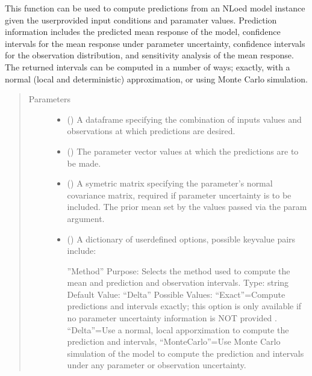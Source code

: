 \documentclass[letterpaper,10pt,english,openany,oneside]{sphinxmanual}
\begin{document}
\begin{fulllineitems}
\begin{fulllineitems}
This function can be used to compute predictions from an NLoed model instance given the
user\sphinxhyphen{}provided input conditions and paramater values. Prediction information includes the
predicted mean response of the model, confidence intervals for the mean response under
parameter uncertainty, confidence intervals for the observation distribution, and sensitivity
analysis of the mean response. The returned intervals can be computed in a number of ways;
exactly, with a normal (local and deterministic) approximation, or using Monte Carlo simulation.
\begin{quote}\begin{description}
\item[{Parameters}] \leavevmode\begin{itemize}
\item {} 
 () \textendash{} A dataframe specifying the combination of inputs values and
observations at which predictions are desired.

\item {} 
 (\sphinxstyleliteralemphasis{\sphinxupquote{, }}) \textendash{} The parameter vector values at which the predictions are to be made.

\item {} 
 (\sphinxstyleliteralemphasis{\sphinxupquote{, }}\sphinxstyleliteralemphasis{\sphinxupquote{, }}) \textendash{} A symetric matrix specifying the parameter’s
normal covariance matrix, required if parameter uncertainty is to be included. The
prior mean set by the values passed via the param argument.

\item {} 
 (\sphinxstyleliteralemphasis{\sphinxupquote{, }}) \textendash{} 
A dictionary of user\sphinxhyphen{}defined options, possible key\sphinxhyphen{}value
pairs include:

”Method” \textendash{}
Purpose: Selects the method used to compute the mean and prediction and observation
intervals.
Type: string
Default Value: “Delta”
Possible Values: “Exact”=Compute predictions and intervals exactly; this
option is only available if no parameter uncertainty information is NOT provided .
“Delta”=Use a normal, local apporximation to compute the prediction and
intervals, “MonteCarlo”=Use Monte Carlo simulation of the model to compute the
prediction and intervals under any parameter or observation uncertainty.


\end{itemize}
\end{description}
\end{quote}
\end{fulllineitems}
\end{fulllineitems}
\end{document}
